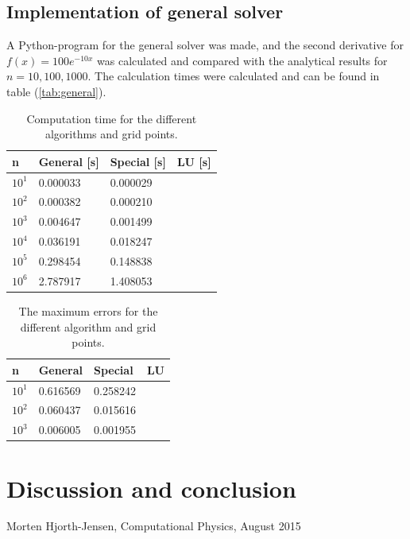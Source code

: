 \documentclass[12pt]{article}
\begin{document}
\subsection{Implementation of general solver}
A Python-program for the general solver was made, and the second derivative for $f(x)=100e^{-10x}$ was calculated and compared with the analytical results for $n = 10, 100, 1000$. The calculation times were calculated and can be found in table (\ref{tab:general}).


\begin{table}[]
\centering
\caption{Computation time for the different algorithms and grid points.}
\label{tab:seconds}
\begin{tabular}{|l|l|l|l|}
\hline
n    & General [s]& Special [s]& LU [s]  \\ \hline
$10^{1}$   & 0.000033        & 0.000029        &      \\ \hline
$10^{2}$  & 0.000382        &  0.000210       &      \\ \hline
$10^{3}$ & 0.004647       &  0.001499       &      \\ \hline
$10^{4}$ & 0.036191       &  0.018247       &      \\ \hline
$10^{5}$ & 0.298454       & 0.148838        &      \\ \hline
$10^{6}$ & 2.787917       & 1.408053        &      \\ \hline
\end{tabular}
\end{table}

\begin{table}[]
\centering
\caption{The maximum errors for the different algorithm and grid points.}
\label{tab:error}
\begin{tabular}{|l|l|l|l|}
\hline
n    & General & Special & LU   \\ \hline
$10^{1}$  & 0.616569        & 0.258242        &      \\ \hline
$10^{2}$  & 0.060437        &  0.015616       &      \\ \hline
$10^{3}$ & 0.006005        & 0.001955        &     \\ \hline
\end{tabular}
\end{table}

\section{Discussion and conclusion}



















\begin{flushleft}

\begin{thebibliography}{}

\singlespacing
\small




  
  Morten Hjorth-Jensen,
  Computational Physics,
  August 2015
  
\end{thebibliography}
\end{flushleft}
\end{document}
